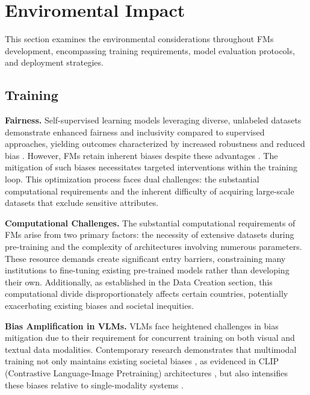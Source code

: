 \section{Enviromental Impact}

This section examines the environmental considerations throughout FMs development, encompassing training requirements, model evaluation protocols, and deployment strategies.

\subsection{Training}
\textbf{Fairness.} Self-supervised learning models leveraging diverse, unlabeled datasets demonstrate enhanced fairness and inclusivity compared to supervised approaches, yielding outcomes characterized by increased robustness and reduced bias \cite{goyal_vision_2022}. However, FMs retain inherent biases despite these advantages \cite{glocker_risk_2023, vaidya_demographic_2024, luo_fairclip_2024}. The mitigation of such biases necessitates targeted interventions within the training loop. This optimization process faces dual challenges: the substantial computational requirements and the inherent difficulty of acquiring large-scale datasets that exclude sensitive attributes.

\textbf{Computational Challenges.} The substantial computational requirements of FMs arise from two primary factors: the necessity of extensive datasets during pre-training and the complexity of architectures involving numerous parameters. These resource demands create significant entry barriers, constraining many institutions to fine-tuning existing pre-trained models rather than developing their own. Additionally, as established in the Data Creation section, this computational divide disproportionately affects certain countries, potentially exacerbating existing biases and societal inequities.

\textbf{Bias Amplification in VLMs.} VLMs face heightened challenges in bias mitigation due to their requirement for concurrent training on both visual and textual data modalities. Contemporary research demonstrates that multimodal training not only maintains existing societal biases \cite{hutchinson_underspecification_2022}, as evidenced in CLIP (Contrastive Language-Image Pretraining) architectures \cite{hall_vision-language_2023}, but also intensifies these biases relative to single-modality systems \cite{booth_bias_2021}.

